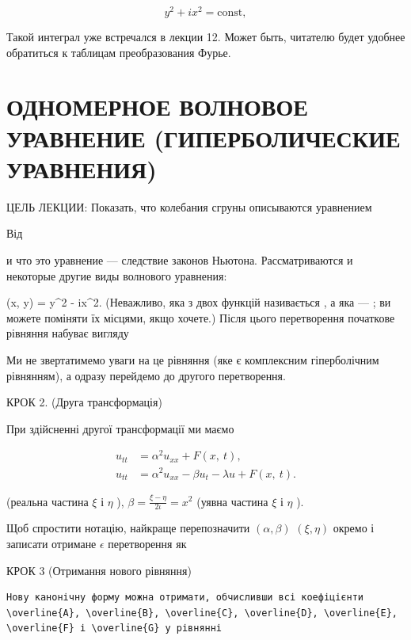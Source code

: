\documentclass[
  ukrainian,
]{article}
\begin{document}
\[
y^2 + ix^2 = \text{const},
\]

Такой интеграл уже встречался в лекции 12. Может быть, читателю будет
удобнее обратиться к таблицам преобразования Фурье.

\section{ОДНОМЕРНОЕ ВОЛНОВОЕ УРАВНЕНИЕ (ГИПЕРБОЛИЧЕСКИЕ
УРАВНЕНИЯ)}\label{ux43eux434ux43dux43eux43cux435ux440ux43dux43eux435-ux432ux43eux43bux43dux43eux432ux43eux435-ux443ux440ux430ux432ux43dux435ux43dux438ux435-ux433ux438ux43fux435ux440ux431ux43eux43bux438ux447ux435ux441ux43aux438ux435-ux443ux440ux430ux432ux43dux435ux43dux438ux44f}

ЦЕЛЬ ЛЕКЦИИ: Показать, что колебания сгруны описываются уравнением

Від

и что это уравнение --- следствие законов Ньютона. Рассматриваются и
некоторые другие виды волнового уравнения:

\eta(x, y) = y\^{}2 - ix\^{}2. (Неважливо, яка з двох функцій
називається \xi , а яка --- \eta ; ви можете поміняти їх місцями, якщо
хочете.) Після цього перетворення початкове рівняння набуває вигляду

Ми не звертатимемо уваги на це рівняння (яке є комплексним гіперболічним
рівнянням), а одразу перейдемо до другого перетворення.

КРОК 2. (Друга трансформація)

При здійсненні другої трансформації ми маємо

\[
\begin{split} u_{tt} &= \alpha^2 u_{xx} + F\left(x, \ t\right), \\ u_{tt} &= \alpha^2 u_{xx} - \beta u_t - \lambda u + F\left(x, \ t\right). \end{split}
\]

(реальна частина \(\xi\) і \(\eta\) ),
\(\beta = \frac{\xi - \eta}{2\iota} = x^2\) (уявна частина \(\xi\) і
\(\eta\) ).

Щоб спростити нотацію, найкраще перепозначити \((\alpha,\beta)\)
\((\xi,\eta)\) окремо і записати отримане \(\epsilon\) перетворення як

КРОК 3 (Отримання нового рівняння)

\begin{verbatim}
Нову канонічну форму можна отримати, обчисливши всі коефіцієнти \overline{A}, \overline{B}, \overline{C}, \overline{D}, \overline{E}, \overline{F} і \overline{G} у рівнянні
\end{verbatim}
\end{document}
